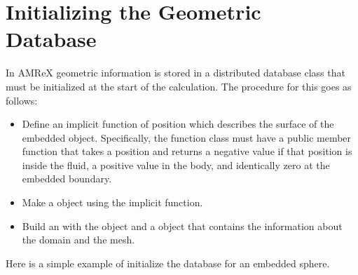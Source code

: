 \documentclass[letterpaper,10pt,english]{sphinxmanual}
\begin{document}
\section{Initializing the Geometric Database}
\label{\detokenize{EB:initializing-the-geometric-database}}\label{\detokenize{EB:sec-eb-ebinit}}
\sphinxAtStartPar
In AMReX geometric information is stored in a distributed database
class that must be initialized at the start of the calculation. The
procedure for this goes as follows:
\begin{itemize}
\item {} 
\sphinxAtStartPar
Define an implicit function of position which describes the surface of the
embedded object. Specifically, the function class must have a public member
function that takes a position and returns a negative value if that position
is inside the fluid, a positive value in the body, and identically zero at the
embedded boundary.

\end{itemize}

\begin{sphinxVerbatim}[commandchars=\\\{\}]
     
\end{sphinxVerbatim}
\begin{itemize}
\item {} 
\sphinxAtStartPar
Make a  object using the implicit function.

\item {} 
\sphinxAtStartPar
Build an  with the  object and a
 object that contains the information about the domain and the
mesh.

\end{itemize}

\sphinxAtStartPar
Here is a simple example of initialize the database for an embedded sphere.
\end{document}
